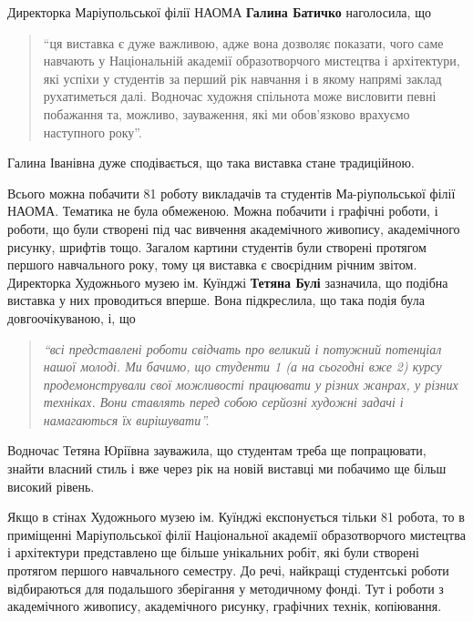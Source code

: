 Директорка Маріупольської філії НАОМА \textbf{Галина Батичко} наголосила, що

\begin{quote}
\enquote{ця виставка є дуже важливою, адже вона дозволяє показати, чого саме
навчають у Національній академії образотворчого мистецтва і
архітектури, які успіхи у студентів за перший рік навчання і в якому
напрямі заклад рухатиметься далі.  Водночас художня спільнота може
висловити певні побажання та, можливо, зауваження, які ми обов'язково
врахуємо наступного року}.
\end{quote}

Галина Іванівна дуже сподівається, що така виставка стане традиційною.


Всього можна побачити 81 роботу викладачів та студентів Ма\hyp{}ріупольської філії
НАОМА. Тематика не була обмеженою. Можна побачити і графічні роботи, і роботи,
що були створені під час вивчення академічного живопису, академічного рисунку,
шрифтів тощо. Загалом картини студентів були створені протягом першого
навчального року, тому ця виставка є своєрідним річним звітом. Директорка
Художнього музею ім. Куїнджі \textbf{Тетяна Булі} зазначила, що подібна
виставка у них проводиться вперше. Вона підкреслила, що така подія була
довгоочікуваною, і, що 

\begin{quote}
\em\enquote{всі представлені роботи свідчать про великий і потужний
потенціал нашої молоді. Ми бачимо, що студенти 1 (а на сьогодні вже 2) курсу
продемонстрували свої можливості працювати у різних жанрах, у різних техніках.
Вони ставлять перед собою серйозні художні задачі і намагаються їх вирішувати}.
\end{quote}

Водночас Тетяна Юріївна зауважила, що студентам треба ще попрацювати, знайти
власний стиль і вже через рік на новій виставці ми побачимо ще більш високий
рівень.


Якщо в стінах Художнього музею ім. Куїнджі експонується тільки 81 робота, то в
приміщенні Маріупольської філії Національної академії образотворчого мистецтва
і архітектури представлено ще більше унікальних робіт, які були створені
протягом першого навчального семестру. До речі, найкращі студентські роботи
відбираються для подальшого зберігання у методичному фонді. Тут і роботи з
академічного живопису, академічного рисунку, графічних технік, копіювання.

